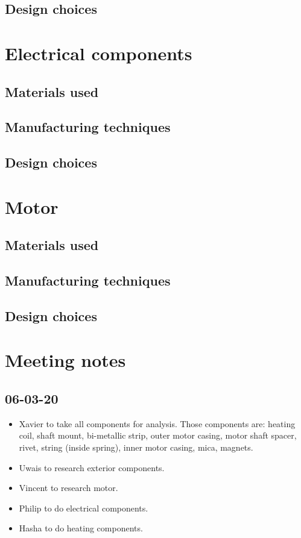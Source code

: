 \documentclass[12pt,a4paper, twoside]{report}
\begin{document}
\section{Design choices}
\chapter{Electrical components}
\section{Materials used}
\section{Manufacturing techniques}
\section{Design choices}
\chapter{Motor}
\section{Materials used}
\section{Manufacturing techniques}
\section{Design choices}
\chapter{Meeting notes}
\section{06-03-20}
\begin{itemize}
  \item Xavier to take all components for analysis. Those components are: heating coil, shaft mount, bi-metallic strip, outer motor casing, motor shaft spacer, rivet, string (inside spring), inner motor casing, mica, magnets.
  \item Uwais to research exterior components. 
  \item Vincent to research motor.
  \item Philip to do electrical components.
  \item Hasha to do heating components.
\end{itemize}
\listoftables


\end{document}
